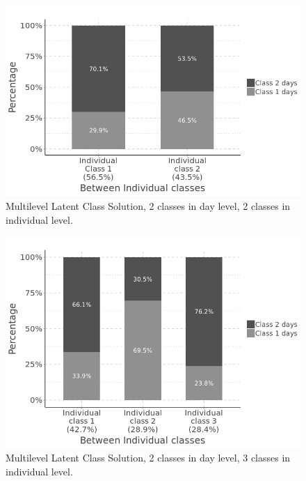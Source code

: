 \begin{figure}[H]
	\centering
	\includegraphics[width=13cm]{Figures/CW2CB2.png}
	\decoRule
	\caption[Multilevel Latent Class Solution (2 $\times$ 2).]{Multilevel Latent Class Solution, 2 classes in day level, 2 classes in individual level.}
	\label{fig:CW2CB2}
\end{figure}




\begin{figure}[H]
	\centering
	\includegraphics[width=13cm]{Figures/CW2CB3.png}
	\decoRule
	\caption[Multilevel Latent Class Solution (2 $\times$ 3).]{Multilevel Latent Class Solution, 2 classes in day level, 3 classes in individual level.}
	\label{fig:CW2CB3}
\end{figure}


